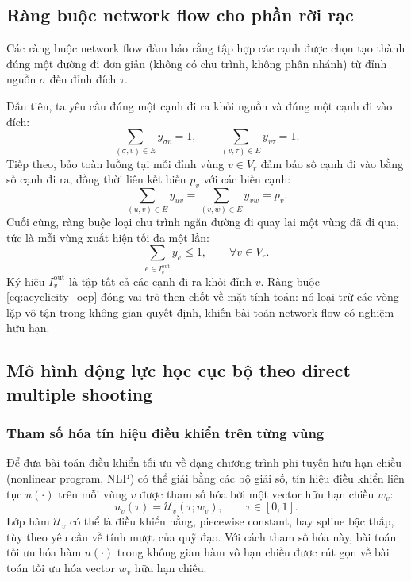 \subsection{Ràng buộc network flow cho phần rời rạc}
\label{subsec:network_flow}

Các ràng buộc network flow đảm bảo rằng tập hợp các cạnh được chọn tạo thành đúng một đường đi đơn giản (không có chu trình, không phân nhánh) từ đỉnh nguồn $\sigma$ đến đỉnh đích $\tau$.

Đầu tiên, ta yêu cầu đúng một cạnh đi ra khỏi nguồn và đúng một cạnh đi vào đích:
\begin{equation}
\sum_{(\sigma,v)\in E} y_{\sigma v}=1,
\qquad
\sum_{(v,\tau)\in E} y_{v\tau}=1.
\label{eq:source_sink_flow_ocp}
\end{equation}
Tiếp theo, bảo toàn luồng tại mỗi đỉnh vùng $v\in V_r$ đảm bảo số cạnh đi vào bằng số cạnh đi ra, đồng thời liên kết biến $p_v$ với các biến cạnh:
\begin{equation}
\sum_{(u,v)\in E} y_{uv}
=
\sum_{(v,w)\in E} y_{vw}
=
p_v.
\label{eq:flow_balance_ocp}
\end{equation}
Cuối cùng, ràng buộc loại chu trình ngăn đường đi quay lại một vùng đã đi qua, tức là mỗi vùng xuất hiện tối đa một lần:
\begin{equation}
\sum_{e\in I_v^{\mathrm{out}}} y_e \le 1,
\qquad \forall v\in V_r.
\label{eq:acyclicity_ocp}
\end{equation}
Ký hiệu $I_v^{\mathrm{out}}$ là tập tất cả các cạnh đi ra khỏi đỉnh $v$. Ràng buộc \eqref{eq:acyclicity_ocp} đóng vai trò then chốt về mặt tính toán: nó loại trừ các vòng lặp vô tận trong không gian quyết định, khiến bài toán network flow có nghiệm hữu hạn.

\subsection{Mô hình động lực học cục bộ theo direct multiple shooting}
\label{subsec:local_dynamics}

\subsubsection{Tham số hóa tín hiệu điều khiển trên từng vùng}

Để đưa bài toán điều khiển tối ưu về dạng chương trình phi tuyến hữu hạn chiều (nonlinear program, NLP) có thể giải bằng các bộ giải số, tín hiệu điều khiển liên tục $u(\cdot)$ trên mỗi vùng $v$ được tham số hóa bởi một vector hữu hạn chiều $w_v$:
\begin{equation}
u_v(\tau)=\mathcal{U}_v(\tau;w_v),
\qquad \tau\in[0,1].
\label{eq:control_param_ocp}
\end{equation}
Lớp hàm $\mathcal{U}_v$ có thể là điều khiển hằng, piecewise constant, hay spline bậc thấp, tùy theo yêu cầu về tính mượt của quỹ đạo. Với cách tham số hóa này, bài toán tối ưu hóa hàm $u(\cdot)$ trong không gian hàm vô hạn chiều được rút gọn về bài toán tối ưu hóa vector $w_v$ hữu hạn chiều.

